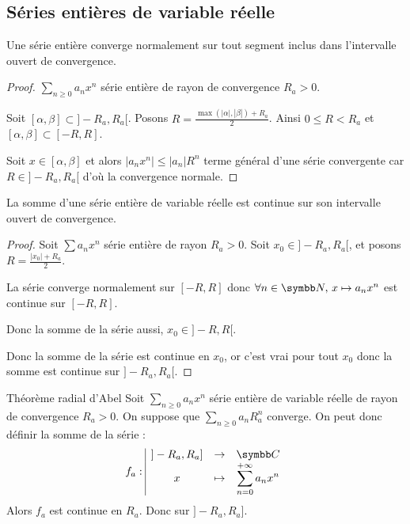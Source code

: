 \subsection{Séries entières de variable réelle}

\begin{theoreme}{}{}
    Une série entière converge normalement sur tout segment inclus dans l'intervalle ouvert de 
    convergence. 
\end{theoreme}

\begin{proof}
    $\sum_{n \geqslant 0 } a_n x^n$ série entière de rayon de convergence $R_a > 0$.

    Soit $[\alpha, \beta] \subset ]-R_a, R_a[$. Posons $R = \frac{\max(|\alpha|, |\beta|) + R_a}{2}$.
    Ainsi $0 \leqslant R < R_a$ et $[\alpha, \beta] \subset [-R, R]$. 

    Soit $x \in [\alpha, \beta]$ et alors 
    $|a_n x^n| \leqslant |a_n| R^n$ terme général d'une série convergente car 
    $R \in ]- R_a, R_a[$ d'où la convergence normale. 
\end{proof}

\begin{corollaire}{}{}
    La somme d'une série entière de variable réelle est continue sur son intervalle 
    ouvert de convergence.
\end{corollaire}

\begin{proof}
    Soit $\sum a_n x^n$ série entière de rayon $R_a > 0$. Soit $x_0 \in ]-R_a, R_a[$, et posons 
    $R = \frac{|x_0| + R_a}{2}$. 

    La série converge normalement sur $[-R, R]$ donc $\forall n \in \N, \, x \mapsto a_n x^n$ 
    est continue sur $[-R, R]$. 

    Donc la somme de la série aussi, $x_0 \in ]-R, R[$.

    Donc la somme de la série est continue en $x_0$, or c'est vrai pour tout 
    $x_0$ donc la somme est continue sur $]-R_a, R_a[$.
\end{proof}

\begin{theoreme}{Théorème radial d'Abel}{}
    Soit $\sum_{n \geqslant 0} a_n x^n$ série entière de variable réelle de rayon de convergence $R_a > 0$.
    On suppose que $\sum_{n \geqslant 0} a_n R_a^n$ converge. 
    On peut donc définir la somme de la série :
    \[\fonction{f_a}{]-R_a, R_a]}{\C}{x}{\sum_{n = 0}^{+\infty} a_n x^n}\]
    Alors $f_a$ est continue en $R_a$. Donc sur $]-R_a, R_a]$.
\end{theoreme}

